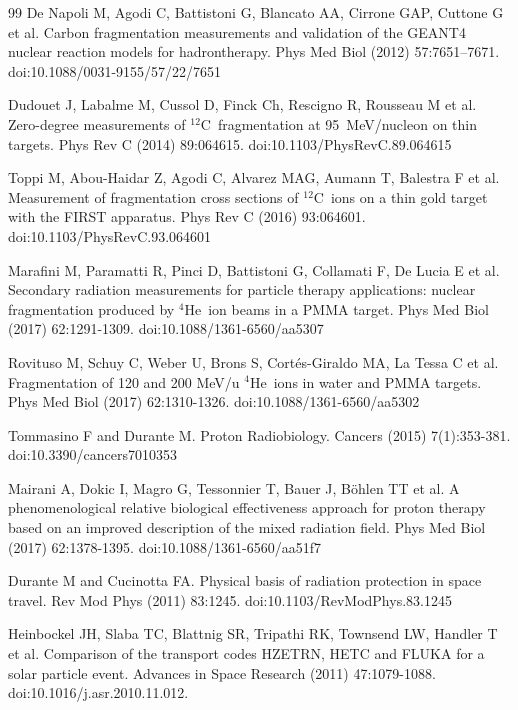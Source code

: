 \documentclass[utf8]{frontiersFPHY} %
\newcommand{\twC}{$^{\mathrm{12}}$C~}
\newcommand{\He}{$^{\mathrm{4}}$He~}
\begin{document}
\begin{thebibliography}{99}
 De Napoli M, Agodi C, Battistoni G, Blancato AA, Cirrone GAP, Cuttone G et al. Carbon fragmentation measurements and validation of the GEANT4 nuclear reaction models for hadrontherapy. Phys Med Biol (2012) 57:7651–7671. doi:10.1088/0031-9155/57/22/7651

 Dudouet J, Labalme M, Cussol D, Finck Ch, Rescigno R, Rousseau M et al. Zero-degree measurements of \twC fragmentation at 95~MeV/nucleon on thin targets. Phys Rev C (2014) 89:064615. doi:10.1103/PhysRevC.89.064615

 Toppi M, Abou-Haidar Z, Agodi C, Alvarez MAG, Aumann T, Balestra F et al. Measurement of fragmentation cross sections of \twC ions on a thin gold target with the FIRST apparatus. Phys Rev C (2016) 93:064601. doi:10.1103/PhysRevC.93.064601

 Marafini M, Paramatti R, Pinci D, Battistoni G, Collamati F, De Lucia E et al. Secondary radiation measurements for particle therapy applications: nuclear fragmentation produced by \He ion beams in a PMMA target. Phys Med Biol (2017) 62:1291-1309. doi:10.1088/1361-6560/aa5307

 Rovituso M, Schuy C, Weber U, Brons S, Cortés-Giraldo MA, La Tessa C et al. Fragmentation of 120 and 200 MeV/u \He ions in water and PMMA targets. Phys Med Biol (2017) 62:1310-1326. doi:10.1088/1361-6560/aa5302

 Tommasino F and Durante M. Proton Radiobiology. Cancers (2015) 7(1):353-381. doi:10.3390/cancers7010353

 Mairani A, Dokic I, Magro G, Tessonnier T, Bauer J, B\"ohlen TT et al. A phenomenological relative biological effectiveness approach for proton therapy based on an improved description of the mixed radiation field. Phys Med Biol (2017) 62:1378-1395. doi:10.1088/1361-6560/aa51f7

 Durante M and Cucinotta FA. Physical basis of radiation protection in space travel. Rev Mod Phys (2011) 83:1245. doi:10.1103/RevModPhys.83.1245

 Heinbockel JH, Slaba TC, Blattnig SR, Tripathi RK, Townsend LW, Handler T et al. Comparison of the transport codes HZETRN, HETC and FLUKA for a solar particle event. Advances in Space Research (2011) 47:1079-1088. doi:10.1016/j.asr.2010.11.012.


\end{thebibliography}
\end{document}
